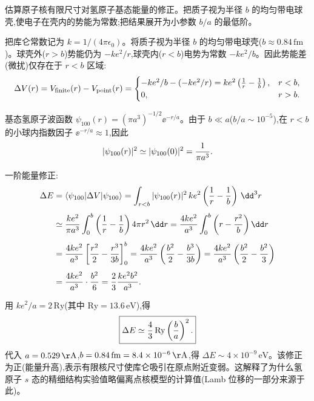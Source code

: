 \begin{question}
估算原子核有限尺寸对氢原子基态能量的修正。把质子视为半径 $b$ 的均匀带电球壳,使电子在壳内的势能为常数;把结果展开为小参数 $b/a$ 的最低阶。
\end{question}
\begin{solution}
把库仑常数记为 $k=1/(4\pi\epsilon_0)$。将质子视为半径 $b$ 的均匀带电球壳($b\approx0.84\,\mathrm{fm}$)。球壳外($r>b$)势能仍为 $-ke^2/r$,球壳内($r<b$)电势为常数 $-ke^2/b$。因此势能差(微扰)仅存在于 $r<b$ 区域:
\[
\Delta V(r)=V_{\rm finite}(r)-V_{\rm point}(r)=\begin{cases}
-ke^2/b - (-ke^2/r) = ke^2\left({1\over r}-{1\over b}\right), & r<b,\\
0, & r>b.
\end{cases}
\]

基态氢原子波函数 $\psi_{100}(r)=(\pi a^3)^{-1/2}\ee^{-r/a}$。由于 $b\ll a$($b/a\sim10^{-5}$),在 $r<b$ 的小球内指数因子 $\ee^{-r/a}\approx 1$,因此
\[
|\psi_{100}(r)|^2 \simeq |\psi_{100}(0)|^2 = {1\over\pi a^3}.
\]

一阶能量修正:
\[
\begin{aligned}
\Delta E &= \langle\psi_{100}|\Delta V|\psi_{100}\rangle
= \int_{r<b} |\psi_{100}(r)|^2\,ke^2\left({1\over r}-{1\over b}\right)\,\dd^3r \\[4pt]
&\simeq {ke^2\over\pi a^3}\int_0^b\left({1\over r}-{1\over b}\right)4\pi r^2\,\dd r
= {4ke^2\over a^3}\int_0^b\left(r-{r^2\over b}\right)\dd r \\[4pt]
&= {4ke^2\over a^3}\left[{r^2\over2}-{r^3\over3b}\right]_0^b
= {4ke^2\over a^3}\left({b^2\over2}-{b^3\over3b}\right)
= {4ke^2\over a^3}\left({b^2\over2}-{b^2\over3}\right) \\[4pt]
&= {4ke^2\over a^3}\cdot{b^2\over6}
= {2\over3}{ke^2 b^2\over a^3}.
\end{aligned}
\]

用 $ke^2/a = 2\,\mathrm{Ry}$(其中 $\mathrm{Ry}=13.6\,\mathrm{eV}$),得
\[
\boxed{\Delta E \simeq {4\over3}\,\mathrm{Ry}\left({b\over a}\right)^2.}
\]
代入 $a=0.529\,\mathrm{\AA}$,$b=0.84\,\mathrm{fm}=8.4\times10^{-6}\,\mathrm{\AA}$,得 $\Delta E\sim 4\times10^{-9}\,\mathrm{eV}$。该修正为正(能量升高),表示有限核尺寸使库仑吸引在原点附近变弱。这解释了为什么氢原子 $s$ 态的精细结构实验值略偏离点核模型的计算值(Lamb 位移的一部分来源于此)。
\end{solution}


